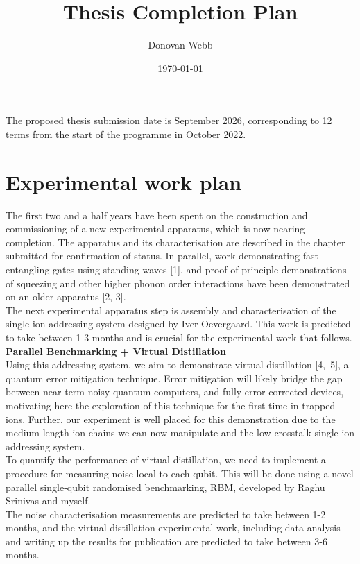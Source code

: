 \documentclass[12pt]{article}
\begin{document}
\title{Thesis Completion Plan}
\author{Donovan Webb}
\date{\today}
\maketitle
\noindent The proposed thesis submission date is September 2026, corresponding to 12 terms from the start of the programme in October 2022.

\section{Experimental work plan}
\noindent The first two and a half years have been spent on the construction and commissioning of a new experimental apparatus, which is now nearing completion. The apparatus and its characterisation are described in the chapter submitted for confirmation of status. In parallel, work demonstrating fast entangling gates using standing waves [1], and proof of principle demonstrations of squeezing and other higher phonon order interactions have been demonstrated on an older apparatus [2, 3].\\

\noindent The next experimental apparatus step is assembly and characterisation of the single-ion addressing system designed by Iver Oevergaard. This work is predicted to take between 1-3 months and is crucial for the experimental work that follows.\\

\noindent \textbf{Parallel Benchmarking + Virtual Distillation}\\

\noindent Using this addressing system, we aim to demonstrate virtual distillation [4,~5], a quantum error mitigation technique. Error mitigation will likely bridge the gap between near-term noisy quantum computers, and fully error-corrected devices, motivating here the exploration of this technique for the first time in trapped ions. Further, our experiment is well placed for this demonstration due to the medium-length ion chains we can now manipulate and the low-crosstalk single-ion addressing system.\\
\noindent To quantify the performance of virtual distillation, we need to implement a procedure for measuring noise local to each qubit. This will be done using a novel parallel single-qubit randomised benchmarking, RBM, developed by Raghu Srinivas and myself.\\
The noise characterisation measurements are predicted to take between 1-2 months, and the virtual distillation experimental work, including data analysis and writing up the results for publication are predicted to take between 3-6 months.\\
\end{document}
